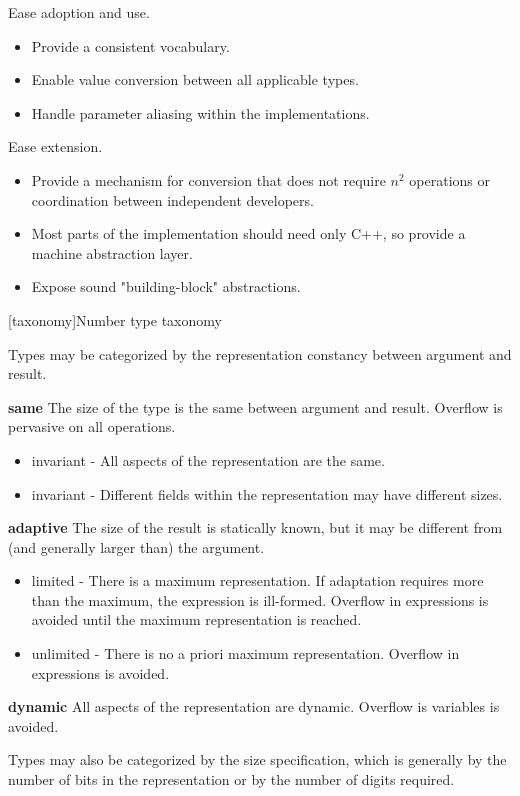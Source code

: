 Ease adoption and use.

\begin{itemize}
\item Provide a consistent vocabulary.
\item Enable value conversion between all applicable types.
\item Handle parameter aliasing within the implementations.
\end{itemize}

Ease extension.

\begin{itemize}
\item Provide a mechanism for conversion that does not require $n^{2}$ operations or coordination between independent developers.
\item Most parts of the implementation should need only C++, so provide a machine abstraction layer.
\item Expose sound "building-block" abstractions.
\end{itemize}

[taxonomy]{Number type taxonomy}

Types may be categorized by the representation constancy between argument and result.

\textbf{same}
The size of the type is the same between argument and result. Overflow is pervasive on all operations.
\begin{itemize}
\item invariant - All aspects of the representation are the same.
\item invariant - Different fields within the representation may have different sizes.
\end{itemize}
\textbf{adaptive}
The size of the result is statically known, but it may be different from (and generally larger than) the argument.
\begin{itemize}
\item limited - There is a maximum representation. If adaptation requires more than the maximum, the expression is ill-formed. Overflow in expressions is avoided until the maximum representation is reached.
\item unlimited - There is no a priori maximum representation. Overflow in expressions is avoided.
\end{itemize}
\textbf{dynamic}
All aspects of the representation are dynamic. Overflow is variables is avoided.

Types may also be categorized by the size specification, which is generally by the number of bits in the representation or by the number of digits required.

